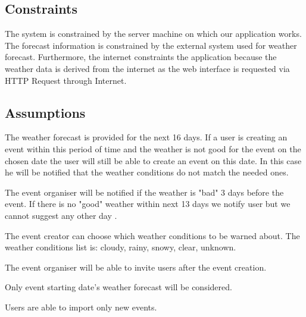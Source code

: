 \subsection{Constraints}
\quad The system is constrained by the server machine on which our application works. The forecast information is constrained by the external system used for weather forecast. Furthermore, the internet constraints the application because the weather data is derived from the internet as the web interface is requested via HTTP Request through Internet.
\subsection{Assumptions}
\quad The weather forecast is provided for the next 16 days. If a user is creating an event within this period of time and the weather is not good for the event on the chosen date the user will still be able to create an event on this date. In this case he will be notified that the weather conditions do not match the needed ones.
\par The event organiser will be notified if the weather is "bad" 3 days before the event. If there is no "good" weather within next 13 days we notify user but we cannot suggest any other day .
\par The event creator can choose which weather conditions to be warned about. The weather conditions list is: cloudy, rainy, snowy, clear, unknown.
\par The event organiser will be able to invite users after the event creation. 
\par Only event starting date's weather forecast will be considered.
\par Users are able to import only new events.